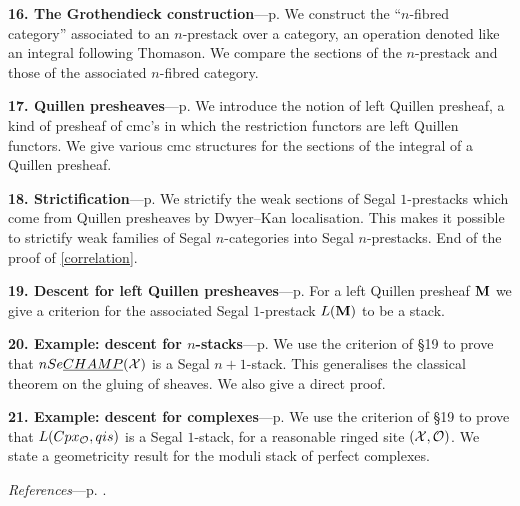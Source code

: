 \noindent
{\bf 16. The Grothendieck construction}---p.
\pageref{gropage}
\newline
{\small
We construct the ``$n$-fibred category'' associated to an $n$-prestack over
a category, an operation denoted like an integral following Thomason. We
compare the sections of the $n$-prestack and those of the associated
$n$-fibred category.}

\noindent
{\bf 17. Quillen presheaves}---p.
\pageref{quipage}
\newline
{\small
We introduce the notion of left Quillen presheaf, a kind of presheaf of
cmc's in which the restriction functors are left Quillen functors. We give
various cmc structures for the sections of the integral of a Quillen
presheaf.}

\noindent
{\bf 18. Strictification}---p.
\pageref{strictpage}
\newline
{\small
We strictify the weak sections of Segal $1$-prestacks which come from
Quillen presheaves by Dwyer--Kan localisation. This makes it possible to
strictify weak families of Segal $n$-categories into Segal $n$-prestacks.
End of the proof of \ref{correlation}.}

\noindent
{\bf 19. Descent for left Quillen presheaves}---p.
\pageref{quidescentepage}
\newline
{\small
For a left Quillen presheaf ${\bf M}$ we give a criterion for the associated
Segal $1$-prestack $L({\bf M} )$ to be a stack.}

\noindent
{\bf 20. Example: descent for $n$-stacks}---p.
\pageref{exemplepage}
\newline
{\small
We use the criterion of \S19 to prove that $nSe\underline{CHAMP}({\cal X} )$ is a
Segal $n+1$-stack. This generalises the classical theorem on the gluing of
sheaves. We also give a direct proof.}

\noindent
{\bf 21. Example: descent for complexes}---p.
\pageref{complexepage}
\newline
{\small
We use the criterion of \S19 to prove that $L(Cpx _{{\cal O}},qis)$ is a Segal
$1$-stack, for a reasonable ringed site $({\cal X} , {\cal O} )$. We state a
geometricity result for the moduli stack of perfect complexes.}

\bigskip

\noindent
\textit{References}---p. \pageref{references}.
